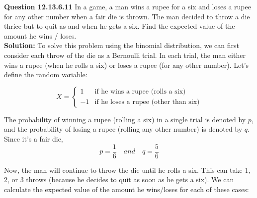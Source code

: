 \documentclass[journal,12pt,twocolumn]{IEEEtran}
\theoremstyle{remark}
\begin{document}
\newcommand{\solution}{\noindent \textbf{Solution: }}
\newcommand{\cosec}{\,\text{cosec}\,}
\providecommand{\dec}[2]{\ensuremath{\overset{#1}{\underset{#2}{\gtrless}}}}
\newcommand{\myvec}[1]{\ensuremath{\begin{pmatrix}#1\end{pmatrix}}}
\newcommand{\mydet}[1]{\ensuremath{\begin{vmatrix}#1\end{vmatrix}}}
\newcommand{\myaugvec}[2]{\ensuremath{\begin{amatrix}{#1}#2\end{amatrix}}}
\providecommand{\rank}{\text{rank}}
\providecommand{\pr}[1]{\ensuremath{\Pr\left(#1\right)}}
\providecommand{\qfunc}[1]{\ensuremath{Q\left(#1\right)}}
	\newcommand*{\permcomb}[4][0mu]{{{}^{#3}\mkern#1#2_{#4}}}
\newcommand*{\perm}[1][-3mu]{\permcomb[#1]{P}}
\newcommand*{\comb}[1][-1mu]{\permcomb[#1]{C}}
\providecommand{\qfunc}[1]{\ensuremath{Q\left(#1\right)}}
\providecommand{\gauss}[2]{\mathcal{N}\ensuremath{\left(#1,#2\right)}}
\providecommand{\diff}[2]{\ensuremath{\frac{d{#1}}{d{#2}}}}
\providecommand{\myceil}[1]{\left \lceil #1 \right \rceil }
\newcommand\figref{Fig.~\ref}
\newcommand\tabref{Table~\ref}
\newcommand{\sinc}{\,\text{sinc}\,}
\newcommand{\rect}{\,\text{rect}\,}
\let\vec\mathbf

\textbf{Question 12.13.6.11}
In a game, a man wins a rupee for a six and loses a rupee for any other number
when a fair die is thrown. The man decided to throw a die thrice but to quit as
and when he gets a six. Find the expected value of the amount he wins / loses.\\
\solution
To solve this problem using the binomial distribution, we can first consider each throw of the die as a Bernoulli trial. In each trial, the man either wins a rupee (when he rolls a six) or loses a rupee (for any other number). Let's define the random variable:

\[
X = 
\begin{cases}
1 & \text{if he wins a rupee (rolls a six)} \\
-1 & \text{if he loses a rupee (other than six)}
\end{cases}
\]

The probability of winning a rupee (rolling a six) in a single trial is denoted by $p$, and the probability of losing a rupee (rolling any other number) is denoted by $q$. Since it's a fair die, $$p = \frac{1}{6}\quad and \quad q = \frac{5}{6}$$

Now, the man will continue to throw the die until he rolls a six. This can take 1, 2, or 3 throws (because he decides to quit as soon as he gets a six). We can calculate the expected value of the amount he wins/loses for each of these cases:
$$ \quad $$
\end{document}

